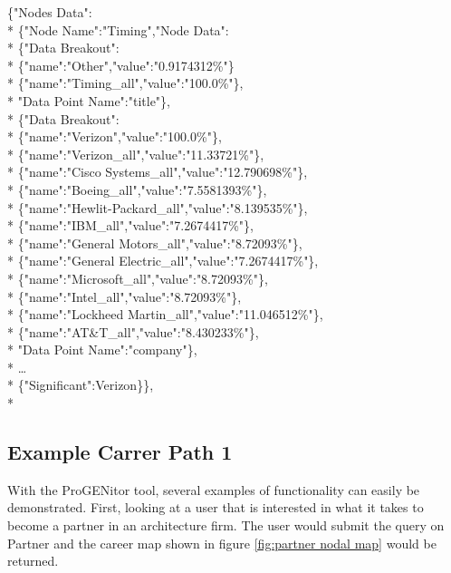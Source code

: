 \pagebreak
\noindent \{"Nodes Data":\\*
	\indent \{"Node Name":"Timing","Node Data":\\*
		\indent \{"Data Breakout":\\*
		\indent \indent	\{"name":"Other","value":"0.9174312\%"\}\\*
		\indent	\indent \{"name":"Timing\_all","value":"100.0\%"\},\\*
		\indent	"Data Point Name":"title"\},\\*
		\indent\{"Data Breakout":\\*
		\indent	\indent	\{"name":"Verizon","value":"100.0\%"\},\\*
		\indent	\indent	\{"name":"Verizon\_all","value":"11.33721\%"\},\\*
		\indent	\indent	\{"name":"Cisco Systems\_all","value":"12.790698\%"\},\\*
		\indent	\indent	\{"name":"Boeing\_all","value":"7.5581393\%"\},\\*
		\indent	\indent	\{"name":"Hewlit-Packard\_all","value":"8.139535\%"\},\\*
		\indent	\indent	\{"name":"IBM\_all","value":"7.2674417\%"\},\\*
		\indent	\indent	\{"name":"General Motors\_all","value":"8.72093\%"\},\\*
		\indent	\indent	\{"name":"General Electric\_all","value":"7.2674417\%"\},\\*
		\indent	\indent	\{"name":"Microsoft\_all","value":"8.72093\%"\},\\*
		\indent	\indent	\{"name":"Intel\_all","value":"8.72093\%"\},\\*
		\indent	\indent	\{"name":"Lockheed Martin\_all","value":"11.046512\%"\},\\*
		\indent	\indent	\{"name":"AT\&T\_all","value":"8.430233\%"\},\\*
		\indent"Data Point Name":"company"\},\\*
		\indent\ldots\\*
		\indent \{"Significant":Verizon\}\},\\*

\subsection{Example Carrer Path 1}
With the ProGENitor tool, several examples of functionality can easily be
demonstrated.  First, looking at a user that is interested in what it takes to
become a partner in an architecture firm.  The user would submit the query on
Partner and the career map shown in figure \ref{fig:partner nodal map} would be
returned.


